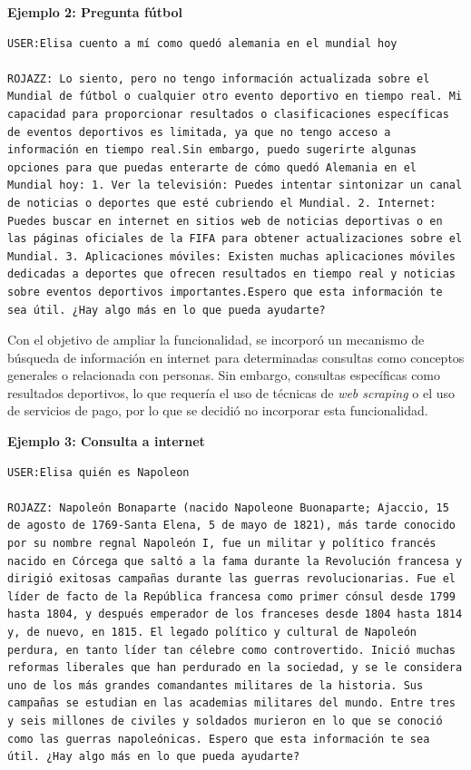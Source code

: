 \textbf{Ejemplo 2: Pregunta fútbol}
\begin{Verbatim}[breaklines=true]
USER:Elisa cuento a mí como quedó alemania en el mundial hoy

ROJAZZ: Lo siento, pero no tengo información actualizada sobre el Mundial de fútbol o cualquier otro evento deportivo en tiempo real. Mi capacidad para proporcionar resultados o clasificaciones específicas de eventos deportivos es limitada, ya que no tengo acceso a información en tiempo real.Sin embargo, puedo sugerirte algunas opciones para que puedas enterarte de cómo quedó Alemania en el Mundial hoy: 1. Ver la televisión: Puedes intentar sintonizar un canal de noticias o deportes que esté cubriendo el Mundial. 2. Internet: Puedes buscar en internet en sitios web de noticias deportivas o en las páginas oficiales de la FIFA para obtener actualizaciones sobre el Mundial. 3. Aplicaciones móviles: Existen muchas aplicaciones móviles dedicadas a deportes que ofrecen resultados en tiempo real y noticias sobre eventos deportivos importantes.Espero que esta información te sea útil. ¿Hay algo más en lo que pueda ayudarte?
\end{Verbatim}

\vspace{0.2cm}

Con el objetivo de ampliar la funcionalidad, se incorporó un mecanismo de búsqueda de información en internet para determinadas consultas como conceptos generales o relacionada con personas. Sin embargo, consultas específicas como resultados deportivos, lo que requería el uso de técnicas de \textit{web scraping} o el uso de servicios de pago, por lo que se decidió no incorporar esta funcionalidad.

\vspace{0.2cm}

\textbf{Ejemplo 3: Consulta a internet}

\begin{Verbatim}[breaklines=true]
USER:Elisa quién es Napoleon

ROJAZZ: Napoleón Bonaparte (nacido Napoleone Buonaparte; Ajaccio, 15 de agosto de 1769-Santa Elena, 5 de mayo de 1821), más tarde conocido por su nombre regnal Napoleón I, fue un militar y político francés nacido en Córcega que saltó a la fama durante la Revolución francesa y dirigió exitosas campañas durante las guerras revolucionarias. Fue el líder de facto de la República francesa como primer cónsul desde 1799 hasta 1804, y después emperador de los franceses desde 1804 hasta 1814 y, de nuevo, en 1815. El legado político y cultural de Napoleón perdura, en tanto líder tan célebre como controvertido. Inició muchas reformas liberales que han perdurado en la sociedad, y se le considera uno de los más grandes comandantes militares de la historia. Sus campañas se estudian en las academias militares del mundo. Entre tres y seis millones de civiles y soldados murieron en lo que se conoció como las guerras napoleónicas. Espero que esta información te sea útil. ¿Hay algo más en lo que pueda ayudarte?
\end{Verbatim}


